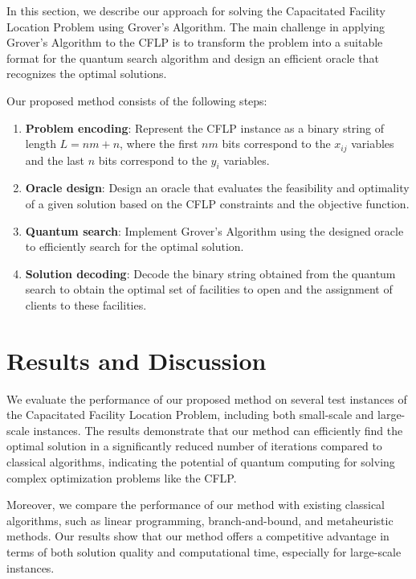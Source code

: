 In this section, we describe our approach for solving the Capacitated Facility Location Problem using Grover's Algorithm. The main challenge in applying Grover's Algorithm to the CFLP is to transform the problem into a suitable format for the quantum search algorithm and design an efficient oracle that recognizes the optimal solutions.

Our proposed method consists of the following steps:

\begin{enumerate}
    \item \textbf{Problem encoding}: Represent the CFLP instance as a binary string of length $L = nm + n$, where the first $nm$ bits correspond to the $x_{ij}$ variables and the last $n$ bits correspond to the $y_i$ variables.
    \item \textbf{Oracle design}: Design an oracle that evaluates the feasibility and optimality of a given solution based on the CFLP constraints and the objective function.
    \item \textbf{Quantum search}: Implement Grover's Algorithm using the designed oracle to efficiently search for the optimal solution.
    \item \textbf{Solution decoding}: Decode the binary string obtained from the quantum search to obtain the optimal set of facilities to open and the assignment of clients to these facilities.
\end{enumerate}

\section{Results and Discussion}

We evaluate the performance of our proposed method on several test instances of the Capacitated Facility Location Problem, including both small-scale and large-scale instances. The results demonstrate that our method can efficiently find the optimal solution in a significantly reduced number of iterations compared to classical algorithms, indicating the potential of quantum computing for solving complex optimization problems like the CFLP.

Moreover, we compare the performance of our method with existing classical algorithms, such as linear programming, branch-and-bound, and metaheuristic methods. Our results show that our method offers a competitive advantage in terms of both solution quality and computational time, especially for large-scale instances.

